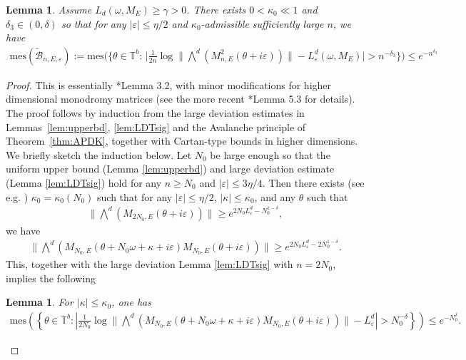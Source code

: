 \documentclass[11pt]{amsart}
\newtheorem{lemma}[theorem]{Lemma}
\newcommand{\T}{\mathbb T}
\def\mes{\mathrm{mes}}
\def\tor{\mathbb{T}}
\begin{document}
\begin{lemma}\label{lem:Msq}
Assume $L_d(\omega,M_E)\geq \gamma>0$. 
There exists $0<\kappa_0\ll1$ and $\delta_3\in (0,\delta)$ so that for any $|\varepsilon|\leq \eta/2$ and $\kappa_0$-admissible sufficiently large $n$,  we have
    \begin{align}\label{eq:meas_tBn}
\mes(\tilde{\mathcal{B}}_{n,E,\varepsilon}):=\mes\Big(\Big\{\theta\in\tor^b:\,  \Big|\frac{1}{2n}\log\|\textstyle{\bigwedge}^d \left(M_{n,E}^2(\theta+i\varepsilon)\right)\|- {L}^d_{\varepsilon}(\omega, M_E)\Big|>n^{-\delta_3}\Big\}\Big)\leq e^{-n^{\delta_3}}
    \end{align}
\end{lemma}
\begin{proof}
This is essentially \cite{GS3}*{Lemma 3.2}, with minor modifications for higher dimensional monodromy matrices (see the more recent \cite{HS3}*{Lemma 5.3} for details).
The proof follows by induction from the large deviation estimates in Lemmas~\ref{lem:upperbd}, \ref{lem:LDTsig} and the Avalanche principle of Theorem~\ref{thm:APDK}, together with Cartan-type bounds in higher dimensions. 
We briefly sketch the induction below.
Let $N_0$ be large enough so that the uniform upper bound (Lemma \ref{lem:upperbd}) and large deviation estimate (Lemma \ref{lem:LDTsig}) hold for any $n\geq N_0$ and $|\varepsilon|\leq 3\eta/4$. Then there exists (see e.g. \cite[Lemma 5.4]{HS3}) $\kappa_0=\kappa_0(N_0)$ such that for any $|\varepsilon|\leq \eta/2$, $|\kappa|\leq \kappa_0$, and any $\theta$ such that
\begin{align}
    \|\textstyle{\bigwedge}^d \left(M_{2N_0,E}(\theta+i\varepsilon)\right)\|\geq e^{2N_0L^d_{\varepsilon}-N_0^{1-\delta}},
\end{align}
we have
\begin{align}
    \|\textstyle{\bigwedge}^d \left(M_{N_0,E}(\theta+N_0\omega+\kappa+i\varepsilon)M_{N_0,E}(\theta+i\varepsilon)\right)\|\geq e^{2N_0L^d_{\varepsilon}-2N_0^{1-\delta}}.
\end{align}
This, together with the large deviation Lemma \ref{lem:LDTsig} with $n=2N_0$, implies the following
\begin{lemma}\label{lem:induct_N0}
For $|\kappa|\leq \kappa_0$, one has 
\begin{align}\label{eq:induction_N0}
\mathrm{mes}\left(\left\{\theta\in \T^b: \left|\frac{1}{2N_0}\log \|\textstyle{\bigwedge}^d \left(M_{N_0,E}(\theta+N_0\omega+\kappa+i\varepsilon)M_{N_0,E}(\theta+i\varepsilon)\right)\|-L^d_{\varepsilon}\right|>N_0^{-\delta}\right\}\right)\leq e^{-N_0^{\delta}}.

\end{align}
\end{lemma}
\end{proof}
\end{document}
